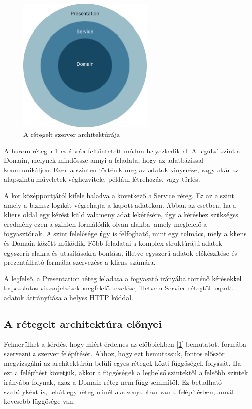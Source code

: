 \begin{figure}[h]
    \centering
    \includegraphics[width=0.6\textwidth]{./images/backend_onion_architecture.png}
    \caption{A rétegelt szerver architektúrája}
    \label{fig:server_onion_architecture}
\end{figure}

A három réteg a \ref{fig:server_onion_architecture}-es ábrán feltüntetett módon helyezkedik el. A legalsó szint a Domain, melynek mindössze annyi a feladata, hogy az adatbázissal kommunikáljon. Ezen a szinten történik meg az adatok kinyerése, vagy akár az alapszintű műveletek véghezvitele, például létrehozás, vagy törlés.

A kör középpontjától kifele haladva a következő a Service réteg. Ez az a szint, amely a biznisz logikát végrehajta a kapott adatokon. Abban az esetben, ha a kliens oldal egy kérést küld valameny adat lekérésére, úgy a kéréshez szükséges eredmény ezen a szinten formálódik olyan alakba, amely megfelelő a fogyasztónak. A szint felelősége úgy is felfogható, mint egy tolmács, mely a kliens és Domain között működik. Főbb feladatai a komplex struktúrájú adatok egyszerű alakra és utasításokra bontása, illetve egyszerű adatok előkészítése és prezentálható formába szervezése a kliens számára.

A legfelső, a Presentation réteg feladata a fogyasztó irányába történő kérésekkel kapcsolatos visszajelzések megfelelő kezelése, illetve a Service rétegtől kapott adatok átirányítása a helyes HTTP kóddal.

\subsection{A rétegelt architektúra előnyei}

Felmerülhet a kérdés, hogy miért érdemes az előbbiekben [\ref{fig:server_onion_architecture}] bemutatott formába szervezni a szerver felépítését. Ahhoz, hogy ezt bemutassuk, fontos először megvizsgálni az architektúrán belüli egyes rétegek közti függőségek folyását. Ha ezt a felépítést követjük, akkor a függőségek a legbelső szintektől a felsőbb szintek irányába folynak, azaz a Domain réteg nem függ semmítől. Ez betudható szabályként is, tehát egy réteg minél alacsonyabban van a felépítésben, annál kevesebb függősége van.

